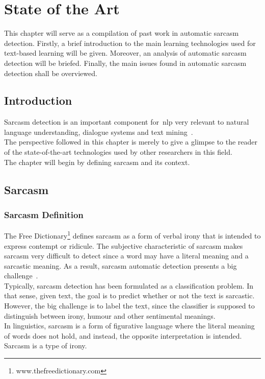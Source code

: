 \chapter{State of the Art}
\label{chap:enabling_technologies}
This chapter will serve as a compilation of past work in automatic sarcasm detection.
Firstly, a brief introduction to the main learning technologies used for text-based learning will be given. Moreover, an analysis of automatic sarcasm detection will be briefed. Finally, the main issues found in automatic sarcasm detection shall be overviewed.

\section{Introduction}
Sarcasm detection is an important component for~\ac{nlp} very relevant to natural language understanding, dialogue systems and text mining~\cite{khodak2017large}.\\ The perspective followed in this chapter is merely to give a glimpse to the reader of the state-of-the-art technologies used by other researchers in this field. \\
The chapter will begin by defining sarcasm and its context. 
\section{Sarcasm} 
\subsection{Sarcasm Definition}
The Free Dictionary\footnote{www.thefreedictionary.com} defines sarcasm as a form of verbal irony that is intended to express contempt or ridicule. The subjective characteristic of sarcasm makes sarcasm very difficult to detect since a word may have a literal meaning and a sarcastic meaning. As a result, sarcasm automatic detection presents a big challenge~\cite{joshi2017automatic}. \\
Typically, sarcasm detection has been formulated as a classification problem. In that sense, given text, the goal is to predict whether or not the text is sarcastic. However, the big challenge is to label the text, since the classifier is supposed to distinguish between irony,  humour and other sentimental meanings.\\
In linguistics, sarcasm is a form of figurative language where the literal meaning of words does not hold, and instead, the opposite interpretation is intended. Sarcasm is a type of irony. 

